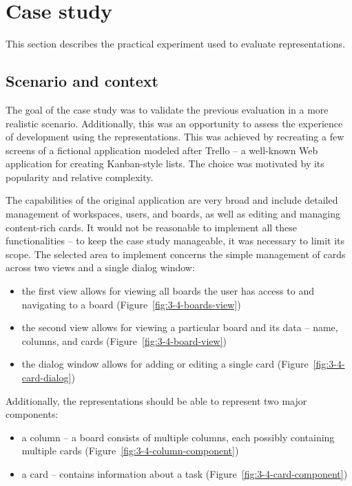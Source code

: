 \section{Case study}\label{sec:case-study}
This section describes the practical experiment used to evaluate representations.

\subsection{Scenario and context}\label{subsec:scenario-and-context}
The goal of the case study was to validate the previous evaluation in a more realistic scenario.
Additionally, this was an opportunity to assess the experience of development using the representations.
This was achieved by recreating a few screens of a fictional application modeled after Trello -- a well-known Web application for creating Kanban-style lists.
The choice was motivated by its popularity and relative complexity.

The capabilities of the original application are very broad and include detailed management of workspaces, users, and boards, as well as editing and managing content-rich cards.
It would not be reasonable to implement all these functionalities -- to keep the case study manageable, it was necessary to limit its scope.
The selected area to implement concerns the simple management of cards across two views and a single dialog window:
\begin{itemize}
    \item the first view allows for viewing all boards the user has access to and navigating to a board (Figure~\ref{fig:3-4-boards-view})
    \item the second view allows for viewing a particular board and its data -- name, columns, and cards (Figure~\ref{fig:3-4-board-view})
    \item the dialog window allows for adding or editing a single card (Figure~\ref{fig:3-4-card-dialog})
\end{itemize}
Additionally, the representations should be able to represent two major components:
\begin{itemize}
    \item a column -- a board consists of multiple columns, each possibly containing multiple cards (Figure~\ref{fig:3-4-column-component})
    \item a card -- contains information about a task (Figure~\ref{fig:3-4-card-component})
\end{itemize}

